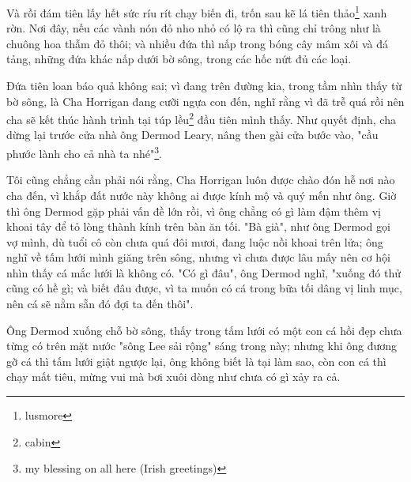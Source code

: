 Và rồi đám tiên lấy hết sức ríu rít chạy biến đi, trốn sau kẽ lá tiên thảo\footnote{lusmore} xanh rờn. Nơi đây, nếu các vành nón đỏ nho nhỏ có lộ ra thì cũng chỉ trông như là chuông hoa thẫm đỏ thôi; và nhiều đứa thì nấp trong bóng cây mâm xôi và đá tảng, những đứa khác nấp dưới bờ sông, trong các hốc nứt đủ các loại.

Đứa tiên loan báo quả không sai; vì đang trên đường kia, trong tầm nhìn thấy từ bờ sông, là Cha Horrigan đang cưỡi ngựa con đến, nghĩ rằng vì đã trễ quá rồi nên cha sẽ kết thúc hành trình tại túp lều\footnote{cabin} đầu tiên mình thấy. Như quyết định, cha dừng lại trước cửa nhà ông Dermod Leary, nâng then gài cửa bước vào, "cầu phước lành cho cả nhà ta nhé"\footnote{my blessing on all here (Irish greetings)}.

Tôi cũng chẳng cần phải nói rằng, Cha Horrigan luôn được chào đón hễ nơi nào cha đến, vì khắp đất nước này không ai được kính mộ và quý mến như ông. Giờ thì ông Dermod gặp phải vấn đề lớn rồi, vì ông chẳng có gì làm đậm thêm vị khoai tây để tỏ lòng thành kính trên bàn ăn tối. "Bà già", như ông Dermod gọi vợ mình, dù tuổi cô còn chưa quá đôi mươi, đang luộc nồi khoai trên lửa; ông nghĩ về tấm lưới mình giăng trên sông, nhưng vì chưa được lâu mấy nên cơ hội nhìn thấy cá mắc lưới là không có. "Có gì đâu", ông Dermod nghĩ, "xuống đó thử cũng có hề gì; và biết đâu được, vì ta muốn có cá trong bữa tối dâng vị linh mục, nên cá sẽ nằm sẵn đó đợi ta đến thôi".

Ông Dermod xuống chỗ bờ sông, thấy trong tấm lưới có một con cá hồi đẹp chưa từng có trên mặt nước "sông Lee sải rộng" sáng trong này; nhưng khi ông đương gỡ cá thì tấm lưới giật ngược lại, ông không biết là tại làm sao, còn con cá thì chạy mất tiêu, mừng vui mà bơi xuôi dòng như chưa có gì xảy ra cả.
